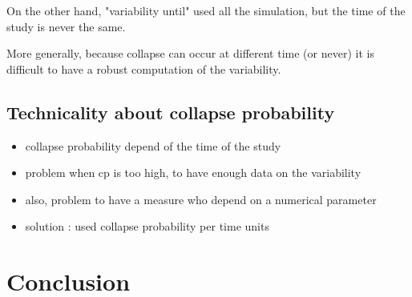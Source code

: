 \documentclass{article}
\begin{document}
On the other hand, "variability until" used all the simulation, but the time of the study is never the same.

More generally, because collapse can occur at different time (or never) it is difficult to have a robust computation of the variability.



\subsection{Technicality about collapse probability}

\begin{itemize}
    \item collapse probability depend of the time of the study
    \item problem when cp is too high, to have enough data on the variability
    \item also, problem to have a measure who depend on a numerical parameter
    \item solution : used collapse probability per time units
\end{itemize}




\newpage

\section*{Conclusion}





\end{document}
